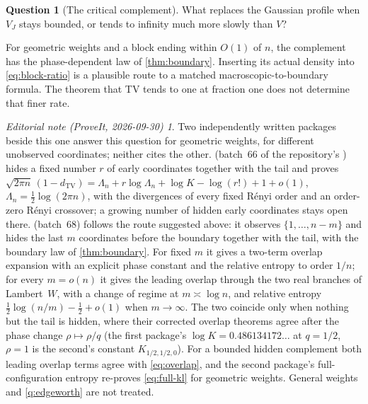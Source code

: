 \documentclass[11pt,a4paper]{article}
\numberwithin{equation}{section}
\theoremstyle{definition}
\newtheorem{question}[question]{Question}
\theoremstyle{remark}
\newtheorem*{ednote}{Editorial note (ProveIt, 2026-09-30)}
\newcommand{\TV}{d_{\mathrm{TV}}}
\begin{document}
\begin{question}[The critical complement]\label{q:critical}
What replaces the Gaussian profile when $V_J$ stays bounded,
or tends to infinity much more slowly than $V$?
\end{question}
For geometric weights and a block ending within $O(1)$ of $n$,
the complement has the phase-dependent law of
\cref{thm:boundary}. Inserting its actual density into
\cref{eq:block-ratio} is a plausible route to a matched
macroscopic-to-boundary formula. The theorem that TV tends to one
at fraction one does not determine that finer rate.
\begin{ednote}
Two independently written packages beside this one answer this question
for geometric weights, for different unobserved coordinates; neither cites
the other.  (batch~66 of
the repository's ) hides a fixed number $r$ of early
coordinates together with the tail and proves
$\sqrt{2\pi n}\,(1-\TV)=\Lambda_n+r\log\Lambda_n+\log K-\log(r!)+1+o(1)$,
$\Lambda_n=\frac12\log(2\pi n)$, with the divergences of every fixed
R\'enyi order and an order-zero R\'enyi crossover; a growing number of
hidden early coordinates stays open there.
 (batch~68) follows
the route suggested above: it observes $\{1,\ldots,n-m\}$ and hides the
last $m$ coordinates before the boundary together with the tail, with the
boundary law of \cref{thm:boundary}. For fixed $m$ it gives a two-term
overlap expansion with an explicit phase constant and the relative entropy
to order $1/n$; for every $m=o(n)$ it gives the leading overlap through the
two real branches of Lambert~$W$, with a change of regime at
$m\asymp\log n$, and relative entropy $\frac12\log(n/m)-\frac12+o(1)$ when
$m\to\infty$. The two coincide only when nothing but the tail is hidden,
where their corrected overlap theorems agree after the phase change
$\rho\mapsto\rho/q$ (the first package's $\log K=0.486134172\ldots$ at
$q=1/2$, $\rho=1$ is the second's constant $K_{1/2,1/2,0}$). For a bounded hidden
complement both leading overlap terms agree with \cref{eq:overlap}, and the second package's
full-configuration entropy re-proves \cref{eq:full-kl} for geometric weights.
General weights and \cref{q:edgeworth} are not treated.
\end{ednote}
\end{document}
